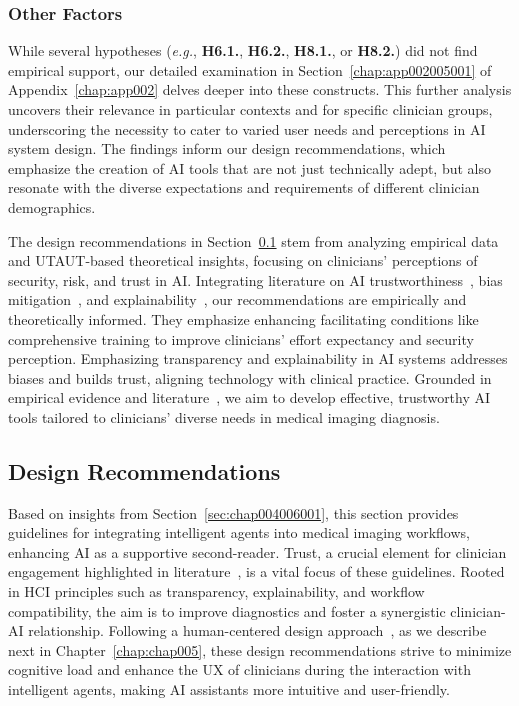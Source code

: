 \subsubsection{Other Factors}
\label{sec:chap004006001008}

\textcolor{revised}{While several hypotheses ({\it e.g.}, {\bf H6.1.}, {\bf H6.2.}, {\bf H8.1.}, or {\bf H8.2.}) did not find empirical support, our detailed examination in Section~\ref{chap:app002005001} of Appendix~\ref{chap:app002} delves deeper into these constructs.
This further analysis uncovers their relevance in particular contexts and for specific clinician groups, underscoring the necessity to cater to varied user needs and perceptions in \ac{AI} system design.
The findings inform our design recommendations, which emphasize the creation of \ac{AI} tools that are not just technically adept, but also resonate with the diverse expectations and requirements of different clinician demographics.}

\textcolor{revised}{The design recommendations in Section~\ref{sec:chap004006002} stem from analyzing empirical data and \ac{UTAUT}-based theoretical insights, focusing on clinicians' perceptions of security, risk, and trust in \ac{AI}.
Integrating literature on \ac{AI} trustworthiness~\cite{10.1145/3411764.3445717}, bias mitigation~\cite{10.1145/3290605.3300831}, and explainability~\cite{10.1145/2939672.2939778}, our recommendations are empirically and theoretically informed.
They emphasize enhancing facilitating conditions like comprehensive training to improve clinicians' effort expectancy and security perception.
Emphasizing transparency and explainability in \ac{AI} systems addresses biases and builds trust, aligning technology with clinical practice.
Grounded in empirical evidence and literature~\cite{CHOUDHURY2022103708}, we aim to develop effective, trustworthy \ac{AI} tools tailored to clinicians' diverse needs in medical imaging diagnosis.}

\subsection{Design Recommendations}
\label{sec:chap004006002}

\textcolor{revised}{Based on insights from Section~\ref{sec:chap004006001}, this section provides guidelines for integrating intelligent agents into medical imaging workflows, enhancing \ac{AI} as a supportive second-reader.
Trust, a crucial element for clinician engagement highlighted in literature~\cite{LIU2022107026}, is a vital focus of these guidelines.
Rooted in \ac{HCI} principles such as transparency, explainability, and workflow compatibility, the aim is to improve diagnostics and foster a synergistic clinician-\acs{AI} relationship.
Following a human-centered design approach~\cite{10.1145/3313831.3376718}, as we describe next in Chapter~\ref{chap:chap005}, these design recommendations strive to minimize cognitive load and enhance the \ac{UX} of clinicians during the interaction with intelligent agents, making \ac{AI} assistants more intuitive and user-friendly.}

